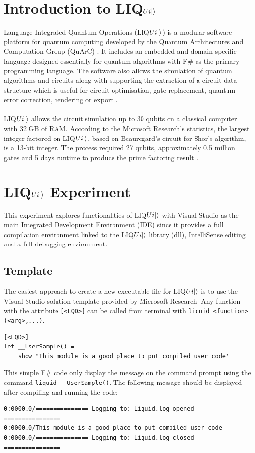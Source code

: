 \documentclass[12pt]{third-rep}
\begin{document}
\section{Introduction to LIQ$Ui{\left\vert{}\right\rangle}$}
Language-Integrated Quantum Operations (LIQ$Ui{\left\vert{}\right\rangle}$) is a modular software platform for quantum computing developed by the Quantum Architectures and Computation Group (QuArC) \cite{liquid-overview}. It includes an embedded and domain-specific language designed essentially for quantum algorithms with F\# as the primary programming language. The software also allows the simulation of quantum algorithms and circuits along with supporting the extraction of a circuit data structure which is useful for circuit optimisation, gate replacement, quantum error correction, rendering or export \cite{liquid-overview,liquid}. \\\\
LIQ$Ui{\left\vert{}\right\rangle}$ allows the circuit simulation up to 30 qubits on a classical computer with 32 GB of RAM. According to the Microsoft Research's statistics, the largest integer factored on LIQ$Ui{\left\vert{}\right\rangle}$, based on Beauregard’s circuit for Shor's algorithm, is a 13-bit integer. The process required 27 qubits, approximately 0.5 million gates and 5 days runtime to produce the prime factoring result \cite{liquid-overview}.

\section{LIQ$Ui{\left\vert{}\right\rangle}$ Experiment}
This experiment explores functionalities of LIQ$Ui{\left\vert{}\right\rangle}$ with Visual Studio as the main Integrated Development Environment (IDE) since it provides a full compilation environment linked to the LIQ$Ui{\left\vert{}\right\rangle}$ library (dll), IntelliSense editing and a full debugging environment.

\subsection{Template}
The easiest approach to create a new executable file for LIQ$Ui{\left\vert{}\right\rangle}$ is to use the Visual Studio solution template provided by Microsoft Research. Any function with the attribute \texttt{[<LQD>]} can be called from terminal with \texttt{liquid <function>(<arg>,...)}.
\begin{verbatim}
[<LQD>]
let __UserSample() =
    show "This module is a good place to put compiled user code"
\end{verbatim}
This simple F\# code only display the message on the command prompt using the command \texttt{liquid \_\_UserSample()}. The following message should be displayed after compiling and running the code: \\
\begin{verbatim}
0:0000.0/=============== Logging to: Liquid.log opened ================
0:0000.0/This module is a good place to put compiled user code
0:0000.0/=============== Logging to: Liquid.log closed ================
\end{verbatim}
\end{document}
